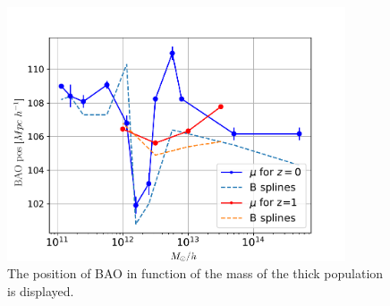 \begin{figure}[htbp]
       \centering

    \includegraphics[width=100mm]{Images/chapter4/PosvsMh2.pdf}
\caption{\small The position of BAO in function of the mass of the thick population is displayed.}
       \label{sigm2}
 \end{figure}


